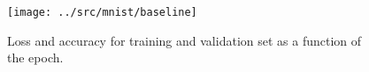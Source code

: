 \begin{answer}
    \begin{figure}
        \centering
        \texttt{[image: ../src/mnist/baseline]}
        \caption{Loss and accuracy for training and validation set as a function of the epoch.}
    \end{figure}
\end{answer}
   
  
